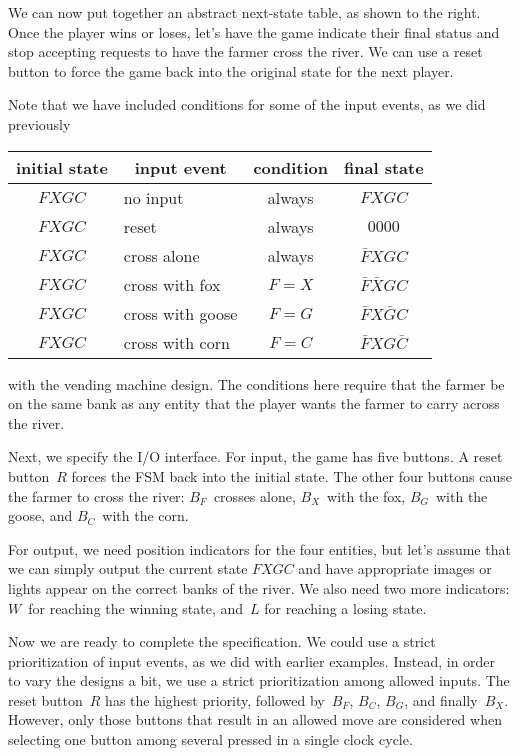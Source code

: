 \begin{minipage}{2.75in}
We can now put together an abstract next-state table, as shown to
the right.  Once the player wins or loses, let's have the game indicate
their final status and stop accepting requests to have the farmer cross
the river.  We can use a reset button to force the game back into the
original state for the next player.\mpline

Note that we have included conditions for some of the input events, as 
we did previously\linebreak
\end{minipage}\hspace{0.25in}%
\begin{minipage}{3.5in}
\begin{tabular}{c|l|c|c}
initial state& \multicolumn{1}{|c|}{input event}& condition& final state\\ \hline
$FXGC$& no input& always& $FXGC$\\
$FXGC$& reset & always& $0000$\\
$FXGC$& cross alone& always& $\bar{F}XGC$\\
$FXGC$& cross with fox& $F=X$& $\bar{F}\bar{X}GC$\\
$FXGC$& cross with goose& $F=G$& $\bar{F}X\bar{G}C$\\
$FXGC$& cross with corn& $F=C$& $\bar{F}XG\bar{C}$\\
\end{tabular}\vspace{12pt}
\end{minipage}\mpdone

with the vending machine design.
%
The conditions here require that the farmer be on the same bank as any
entity that the player wants the farmer to carry across the river.

Next, we specify the I/O interface. 
%
For input, the game has five buttons.  A reset button~$R$ forces the
FSM back into the initial state.  The other four buttons cause the
farmer to cross the river: $B_F$~crosses alone, $B_X$~with the fox,
$B_G$~with the goose, and $B_C$~with the corn.

For output, we need position indicators for the four entities, but let's
assume that we can simply output the current state $FXGC$ and have
appropriate images or lights appear on the correct banks of the 
river.  We also need two more indicators: $W$~for reaching the winning
state, and~$L$ for reaching a losing state.

Now we are ready to complete the specification.  We could use a strict
prioritization of input events, as we did with earlier examples.  Instead,
in order to vary the designs a bit, we use a strict prioritization among 
allowed inputs.  The reset button~$R$ has the highest priority, followed
by~$B_F$, $B_C$, $B_G$, and finally~$B_X$.  However, only those buttons 
that result in an allowed move are considered when selecting one button 
among several pressed in a single clock cycle.

